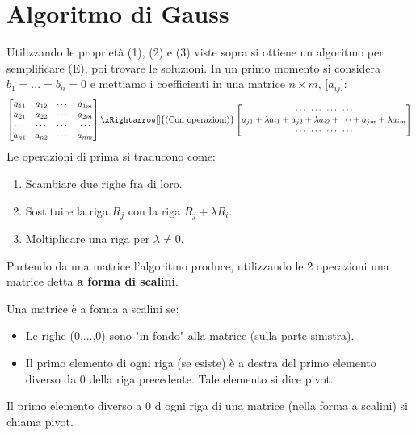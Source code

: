 \newpage
\section{Algoritmo di Gauss}
Utilizzando le proprietà (1), (2) e (3) viste sopra si ottiene un algoritmo per semplificare (E), poi trovare le soluzioni.
In un primo momento si considera $b_1 = ... = b_n = 0$ e mettiamo i coefficienti in una matrice $n \times m$, [$a_{ij}$]:
\[
\begin{bmatrix}
a_{11} & a_{12} & \cdots & a_{1m}\\
a_{21} & a_{22} & \cdots & a_{2m}\\
\cdots & \cdots & \cdots & \cdots \\
a_{n1} & a_{n2} & \cdots & a_{nm}
\end{bmatrix}
\xRightarrow[]{\text{(Con operazioni)}}
\begin{bmatrix}
\cdots\:\: \cdots \:\: \cdots \:\: \cdots \\
a_{j1} + \lambda a_{i1} + a_{j2} + \lambda a_{i2} + \cdots + a_{jm} + \lambda a_{im}\\
\cdots \:\: \cdots \:\: \cdots \:\: \cdots
\end{bmatrix}
\]
Le operazioni di prima si traducono come:
\begin{enumerate}[label=\Alph*]
    \item Scambiare due righe fra di loro.
    \item Sostituire la riga $R_j$ con la riga $R_j + \lambda R_i$.
    \item Moltiplicare una riga per $\lambda \neq 0$.
\end{enumerate}
Partendo da una matrice l'algoritmo produce, utilizzando le 2 operazioni una matrice detta \textbf{a forma di scalini}.

\begin{definition}
Una matrice è a forma a scalini se:
\begin{itemize}
    \item Le righe (0,...,0) sono "in fondo" alla matrice (sulla parte sinistra).
    \item Il primo elemento di ogni riga (se esiste) è a destra del primo elemento diverso da 0 della riga precedente. Tale elemento si dice pivot.
\end{itemize}
\end{definition}

\begin{definition}[Pivot]
Il primo elemento diverso a 0 d ogni riga di una matrice (nella forma a scalini) si chiama pivot.
\end{definition}

